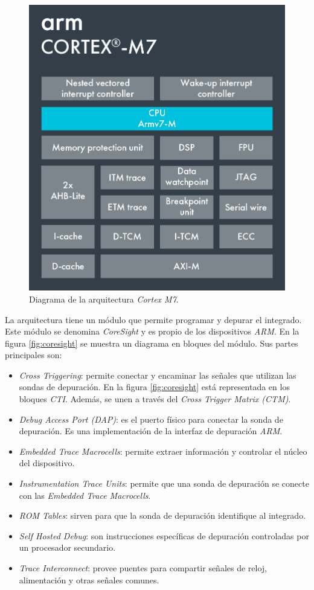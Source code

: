 \begin{figure}[htbp]
	\centering
	\includegraphics[width=.7\textwidth]{./Figures/Cortex-M7.png}
    \caption{Diagrama de la arquitectura \emph{Cortex M7}\protect\footnotemark.}
	\label{fig:cortexm}
\end{figure}


La arquitectura tiene un módulo que permite programar y depurar el integrado.
Este módulo se denomina \emph{CoreSight} y es propio de los dispositivos \emph{ARM}.
En la figura \ref{fig:coresight} se muestra un diagrama en bloques del módulo.
Sus partes principales son:

\begin{itemize}
    \item \emph{Cross Triggering}: permite conectar y encaminar las señales que utilizan las sondas de depuración.
        En la figura \ref{fig:coresight} está representada en los bloques \emph{CTI}.
        Además, se unen a través del \emph{Cross Trigger Matrix (CTM)}.
    \item \emph{Debug Access Port (DAP)}: es el puerto físico para conectar la sonda de depuración. Es una implementación de la interfaz de depuración \emph{ARM}.
    \item \emph{Embedded Trace Macrocells}: permite extraer información y controlar el núcleo del dispositivo.
    \item \emph{Instrumentation Trace Units}: permite que una sonda de depuración se conecte con las \emph{Embedded Trace Macrocells}.
    \item \emph{ROM Tables}: sirven para que la sonda de depuración identifique al integrado.
    \item \emph{Self Hosted Debug}: son instrucciones específicas de depuración controladas por un procesador secundario.
    \item \emph{Trace Interconnect}: provee puentes para compartir señales de reloj, alimentación y otras señales comunes.
\end{itemize}

